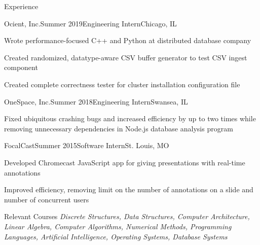 \documentclass{resume} %
\begin{document}
            \begin{rSection}{Experience}
                \begin{rSubsection}{Ocient, Inc.}{Summer 2019}{Engineering Intern}{Chicago, IL} 
                \item Wrote performance-focused C++ and Python at distributed database company
                \item Created randomized, datatype-aware CSV buffer generator to test CSV ingest component
                \item Created complete correctness tester for cluster installation configuration file
                \end{rSubsection}

                \begin{rSubsection}{OneSpace, Inc.}{Summer 2018}{Engineering Intern}{Swansea, IL} 
                \item Fixed ubiquitous crashing bugs and increased efficiency by up to two times while removing unnecessary dependencies in Node.js database analysis program
                \end{rSubsection}

                \begin{rSubsection}{FocalCast}{Summer 2015}{Software Intern}{St. Louis, MO}
                \item Developed Chromecast JavaScript app for giving presentations with real-time annotations
                \item Improved efficiency, removing limit on the number of annotations on a slide and number of concurrent users
                \end{rSubsection}

            \end{rSection}


    \begin{rSection}{Relevant Courses}
        \textit{Discrete Structures, Data Structures, Computer Architecture, Linear Algebra, Computer Algorithms, Numerical Methods, Programming Languages, Artificial Intelligence, Operating Systems, Database Systems}

    \end{rSection}
\end{document}
